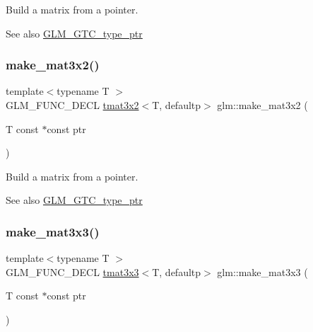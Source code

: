 Build a matrix from a pointer. \begin{DoxySeeAlso}{See also}
\hyperlink{group__gtc__type__ptr}{G\+L\+M\+\_\+\+G\+T\+C\+\_\+type\+\_\+ptr} 
\end{DoxySeeAlso}
\mbox{\label{group__gtc__type__ptr_gabe1e5066608a66da7a94f802b57b4eed}} 
\subsubsection{\texorpdfstring{make\+\_\+mat3x2()}{make\_mat3x2()}}
{\footnotesize\ttfamily template$<$typename T $>$ \\
G\+L\+M\+\_\+\+F\+U\+N\+C\+\_\+\+D\+E\+CL \hyperlink{structglm_1_1tmat3x2}{tmat3x2}$<$T, defaultp$>$ glm\+::make\+\_\+mat3x2 (\begin{DoxyParamCaption}\item[{T const $\ast$const}]{ptr }\end{DoxyParamCaption})}

Build a matrix from a pointer. \begin{DoxySeeAlso}{See also}
\hyperlink{group__gtc__type__ptr}{G\+L\+M\+\_\+\+G\+T\+C\+\_\+type\+\_\+ptr} 
\end{DoxySeeAlso}
\mbox{\label{group__gtc__type__ptr_ga3cbe7adf857c867cee77eae4617abadd}} 
\subsubsection{\texorpdfstring{make\+\_\+mat3x3()}{make\_mat3x3()}}
{\footnotesize\ttfamily template$<$typename T $>$ \\
G\+L\+M\+\_\+\+F\+U\+N\+C\+\_\+\+D\+E\+CL \hyperlink{structglm_1_1tmat3x3}{tmat3x3}$<$T, defaultp$>$ glm\+::make\+\_\+mat3x3 (\begin{DoxyParamCaption}\item[{T const $\ast$const}]{ptr }\end{DoxyParamCaption})}

